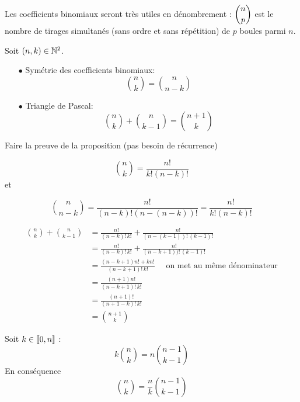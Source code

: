 \documentclass[a4paper, 11pt,reqno]{article}
\begin{document}
\begin{rem}
Les coefficients binomiaux seront tr\`es utiles en d\'enombrement : $\displaystyle \binom{n}{p}$ est le nombre de tirages simultan\'es (sans ordre et sans r\'ep\'etition) de $p$ boules parmi $n$.
\end{rem}




\begin{prop} Soit $(n,k)\in\mathbb{N}^2$.
\begin{itemize}
\item[$\bullet$] Sym\'etrie des coefficients binomiaux: 
$$\binom{n}{k}=\binom{n}{n-k}$$
\item[$\bullet$] Triangle de Pascal:\\
$$\binom{n}{k}+\binom{n}{k-1}=\binom{n+1}{k}$$
\end{itemize}
\end{prop}

\begin{exercice}
Faire la preuve de la proposition (pas besoin de récurrence)
\end{exercice}


\begin{cor}
$$\binom{n}{k}=\frac{n! }{k! (n-k)!}$$
et 

$$\binom{n}{n-k}=\frac{n! }{(n-k)! (n-(n-k))!}=\frac{n! }{k! (n-k)!}$$



\begin{align*}
\binom{n}{k} +\binom{n}{k-1} &= \frac{n!}{(n-k)!\,k!}+ \frac{n!}{(n-(k-1))!\,(k-1)!}\\
&= \frac{n!}{(n-k)!\,k!}+ \frac{n!}{(n-k+1))!\,(k-1)!}\\
&= \frac{(n-k+1)n! + k  n!}{(n-k+1)!\,k!} \quad \text{ on met au même dénominateur} \\
&= \frac{(n+1)n!}{(n-k+1)!\,k!} \\
&= \frac{(n+1)!}{(n+1-k)!\,k!} \\
&=\binom{n+1}{k}
\end{align*}
\end{cor}



\begin{prop}
Soit $k\in \llbracket 0,n\rrbracket$ :
$$k\binom{n}{k}= n\binom{n-1}{k-1}$$
En conséquence 
$$\binom{n}{k}= \frac{n}{k}\binom{n-1}{k-1}$$
\end{prop}
%
% 
\end{document}
